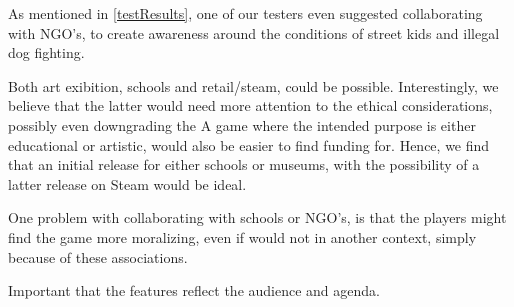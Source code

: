 As mentioned in \ref{testResults}, one of our testers even suggested collaborating with NGO's, to create awareness around the conditions of street kids and illegal dog fighting. \

Both art exibition, schools and retail/steam, could be possible. Interestingly, we believe that the latter would need more attention to the ethical considerations, possibly even downgrading the 
A game where the intended purpose is either educational or artistic, would also be easier to find funding for. 
Hence, we find that an initial release for either schools or museums, with the possibility of a latter release on Steam  would be ideal.\

One problem with collaborating with schools or NGO's, is that the players might find the game more moralizing, even if would not in another context, simply because of these associations.

 Important that the features reflect the audience and agenda.
